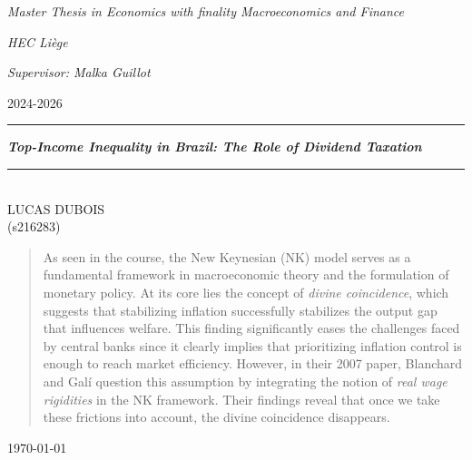 \documentclass[a4paper, 12pt]{article}
\begin{document}
\pagestyle{fancy}
\fancyhf{}
\rhead{\textsc{\today}}
\cfoot{\thepage}
\renewcommand{\headrulewidth}{0pt}


\begin{titlepage}
\vspace{12cm}
\par
\textit{Master Thesis in Economics with finality Macroeconomics and Finance}
\par
\textit{HEC Liège}
\par
\textit{Supervisor: Malka Guillot}
\par
2024-2026
\begin{center}
\rule{\linewidth}{1pt}
\vspace{0,5cm}
\vspace{0.75cm}
\begin{spacing}{1.75}
{\LARGE \textbf{\textit{Top-Income Inequality in Brazil: The Role of Dividend Taxation}}}
\vspace{0.75cm}
\end{spacing}
\rule{\linewidth}{1pt}
\vspace{0,5cm}
\\
\textsc{{\large LUCAS DUBOIS}}
\\
\vspace{0,5cm}
{(s216283)}\end{center}
\vspace{0.5cm}
\begin{abstract}
    \hspace{1cm} As seen in the course, the New Keynesian (NK) model serves as a fundamental framework in macroeconomic theory and the formulation of monetary policy. 
At its core lies the concept of \textit{divine coincidence}, which suggests that stabilizing inflation successfully stabilizes the output gap that influences welfare. 
This finding significantly eases the challenges faced by central banks since it clearly implies that prioritizing inflation control is enough to reach market efficiency.
However, in their 2007 paper, Blanchard and Galí question this assumption by integrating the notion of \textit{real wage rigidities } in the NK framework. 
Their findings reveal that once we take these frictions into account, the divine coincidence disappears.
\end{abstract}

\vspace{3cm}

\begin{center}
{\Large \today}
\end{center}
\end{titlepage}
\tableofcontents
\newpage
\end{document}
